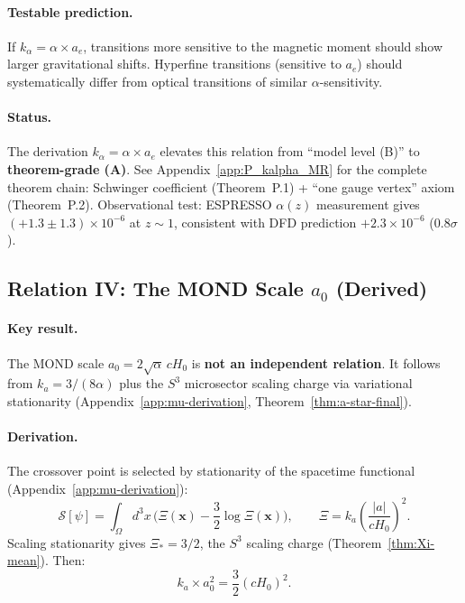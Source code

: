 \paragraph{Testable prediction.}
If $k_\alpha = \alpha \times a_e$, transitions more sensitive to the magnetic moment should show larger gravitational shifts. Hyperfine transitions (sensitive to $a_e$) should systematically differ from optical transitions of similar $\alpha$-sensitivity.

\paragraph{Status.}
The derivation $k_\alpha = \alpha \times a_e$ elevates this relation from ``model level (B)'' to \textbf{theorem-grade (A)}. 
See Appendix~\ref{app:P_kalpha_MR} for the complete theorem chain: Schwinger coefficient (Theorem~P.1) + ``one gauge vertex'' axiom (Theorem~P.2).
Observational test: ESPRESSO $\alpha(z)$ measurement gives $(+1.3 \pm 1.3) \times 10^{-6}$ at $z \sim 1$, consistent with DFD prediction $+2.3 \times 10^{-6}$ ($0.8\sigma$).

\subsection{Relation IV: The MOND Scale $a_0$ (Derived)}\label{sec:alpha-a0}

\paragraph{Key result.}
The MOND scale $a_0 = 2\sqrt{\alpha}\,cH_0$ is \textbf{not an independent relation}. It follows from $k_a = 3/(8\alpha)$ plus the $S^3$ microsector scaling charge via variational stationarity (Appendix~\ref{app:mu-derivation}, Theorem~\ref{thm:a-star-final}).

\paragraph{Derivation.}
The crossover point is selected by stationarity of the spacetime functional (Appendix~\ref{app:mu-derivation}):
\begin{equation}
\mathcal{S}[\psi] = \int_\Omega d^3x\,\Big(\Xi(\mathbf{x}) - \frac{3}{2}\log\Xi(\mathbf{x})\Big), \qquad \Xi = k_a\left(\frac{|a|}{cH_0}\right)^2.
\end{equation}
Scaling stationarity gives $\Xi_* = 3/2$, the $S^3$ scaling charge (Theorem~\ref{thm:Xi-mean}). Then:
\begin{equation}
k_a \times a_0^2 = \frac{3}{2}(cH_0)^2.
\end{equation}

